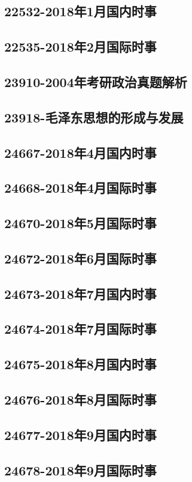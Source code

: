\subsection{22532-2018年1月国内时事}

\subsection{22535-2018年2月国际时事}

\subsection{23910-2004年考研政治真题解析}

\subsection{23918-毛泽东思想的形成与发展}

\subsection{24667-2018年4月国内时事}

\subsection{24668-2018年4月国际时事}

\subsection{24670-2018年5月国际时事}

\subsection{24672-2018年6月国际时事}

\subsection{24673-2018年7月国内时事}

\subsection{24674-2018年7月国际时事}

\subsection{24675-2018年8月国内时事}

\subsection{24676-2018年8月国际时事}

\subsection{24677-2018年9月国内时事}

\subsection{24678-2018年9月国际时事}

